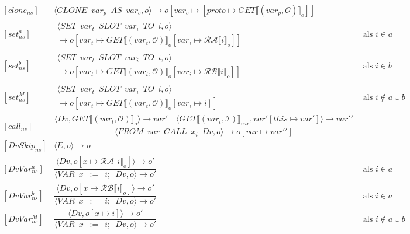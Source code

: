 \documentclass[12pt]{article}
\newcommand{\RA}{\mathcal{RA}}
\newcommand{\RB}{\mathcal{RB}}
\begin{document}
\[
\begin{matrix}
[clone_{ns}] &
\langle CLONE \enspace var_p \enspace AS \enspace var_c, o\rangle 
\rightarrow
o[var_c \mapsto [proto \mapsto GET\llbracket (var_p, \mathcal{O}) \rrbracket_o]]\\
[set_{ns}^{a}] &
\begin{matrix}
\langle SET \enspace var_t \enspace SLOT \enspace var_i \enspace TO \enspace i, o \rangle\\
\rightarrow
o[var_t \mapsto GET\llbracket (var_t, \mathcal{O}) \rrbracket_o[var_i \mapsto \RA 
 \llbracket i \rrbracket_o]]
\end{matrix}
& \mbox{ als } i \in a \\
[set_{ns}^{b}] &
\begin{matrix}
\langle SET \enspace var_t \enspace SLOT \enspace var_i \enspace TO \enspace i, o \rangle\\
\rightarrow
o[var_t \mapsto GET\llbracket (var_t, \mathcal{O}) \rrbracket_o[var_i \mapsto \RB 
\llbracket i \rrbracket_o]]
\end{matrix}
& \mbox{ als } i \in b \\
[set_{ns}^{M}] &
\begin{matrix}
\langle SET \enspace var_t \enspace SLOT \enspace var_i \enspace TO \enspace i, o \rangle\\
\rightarrow
o[var_t \mapsto GET\llbracket (var_t, \mathcal{O}) \rrbracket_o[var_i \mapsto i]]
\end{matrix}
& \mbox{ als } i \not\in a \cup b \\
[call_{ns}] &
\dfrac
{
	\langle Dv, GET\llbracket (var_t, \mathcal{O}) \rrbracket_o \rangle \rightarrow var\prime
	\quad
	\langle  GET\llbracket (var_t, \mathcal{I}) \rrbracket_{var}, var\prime[this \mapsto var\prime] \rangle
	\rightarrow
	var\prime\prime
}
{
	\langle FROM \enspace var \enspace CALL \enspace x_i \enspace Dv,o \rangle
	\rightarrow
	o[var \mapsto var\prime\prime]
}\\
[DvSkip_{ns}] &
\langle E,o \rangle \rightarrow o \\
[DvVar_{ns}^{a}] &
\dfrac
{	\langle Dv,o[x \mapsto \RA \llbracket i \rrbracket_o] \rangle \rightarrow o\prime }
{
	\langle VAR \enspace x \enspace := \enspace i; \enspace Dv, o \rangle
	\rightarrow
	o\prime
} &
\mbox{ als } i \in a \\
[DvVar_{ns}^{b}] &
\dfrac
{	\langle Dv,o[x \mapsto \RB \llbracket i \rrbracket_o] \rangle \rightarrow  o\prime }
{
	\langle VAR \enspace x \enspace := \enspace i; \enspace Dv, o \rangle
	\rightarrow
	o\prime
} &
\mbox{ als } i \in a \\
[DvVar_{ns}^{M}] &
\dfrac
{	\langle Dv,o[x \mapsto i] \rangle \rightarrow o\prime }
{
	\langle VAR \enspace x \enspace := \enspace i; \enspace Dv, o \rangle
	\rightarrow
	o\prime
} &
\mbox{ als } i \not\in a \cup b \\

\end{matrix}
\]
\end{document}
